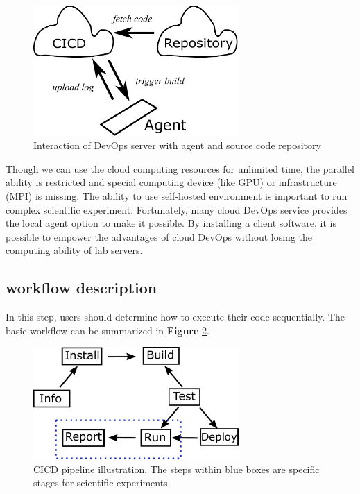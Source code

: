 \documentclass{IEEEcsmag}
\begin{document}
\begin{figure}[!ht]
\centerline{\includegraphics[width=18.5pc]{principal.pdf}}
\caption{Interaction of DevOps server with agent and source code repository}\label{fig:principal}
\end{figure}

Though we can use the cloud computing resources for unlimited time, the parallel ability is restricted and special computing device (like GPU) or infrastructure (MPI) is missing. The ability to use self-hosted environment is important to run complex scientific experiment. Fortunately, many cloud DevOps service provides the local agent option to make it possible. By installing a client software, it is possible to empower the advantages of cloud DevOps without losing the computing ability of lab servers. 
\subsection{workflow description}
In this step, users should determine how to execute their code sequentially. The basic workflow can be summarized in \textbf{Figure} \ref{fig:cicdworkflow}.

\begin{figure}[!ht]
\centerline{\includegraphics[width=18.5pc]{workflow.pdf}}
\caption{CICD pipeline illustration. The steps within blue boxes are specific stages for scientific experiments. }\label{fig:cicdworkflow}
\end{figure}
\end{document}
